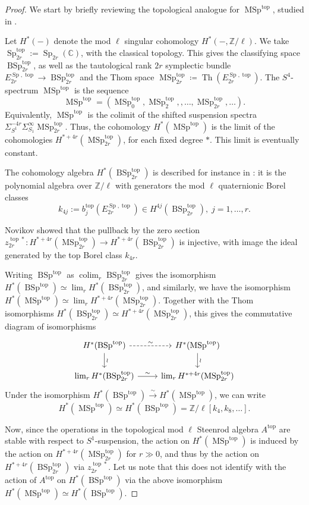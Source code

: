\documentclass[10pt]{amsart}
\theoremstyle{definition}
\theoremstyle{plain}
\numberwithin{equation}{section}
\newcommand{\0}{\emptyset}
\newcommand{\C}{{\mathbb C}}
\newcommand{\Z}{{\mathbb Z}}
\newcommand{\MSp}{{\operatorname{MSp}}}
\newcommand{\BSp}{{\operatorname{BSp}}}
\newcommand{\Sp}{{\operatorname{Sp}}}
\newcommand{\Th}{{\operatorname{Th}}}
\renewcommand{\top}{{\operatorname{top}}}
\newcommand{\colim}{{\operatorname*{colim}}}
\begin{document}
\begin{proof}
    We start by briefly reviewing the topological analogue for $\MSp^{\top}$, studied in \cite[Chapter 1]{Thomcompl}.

    Let $H^*(-)$ denote the mod $\ell$ singular cohomology $H^*(-,\mathbb{Z}/\ell)$. We take $\Sp_{2r}^\top:=\Sp_{2r}(\C)$, with the classical topology. This gives the classifying space $\BSp_{2r}^\top$, as well as the tautological rank $2r$ symplectic bundle $E^{\Sp,\top}_{2r}\to \BSp_{2r}^\top$ and the Thom space $\MSp_{2r}^\top \coloneqq \Th(E^{\Sp,\top}_{2r})$. The $S^4$-spectrum $\MSp^{\top}$ is the sequence 
    $$\MSp^\top=(\MSp_0^\top, \MSp_2^\top, ,\ldots,\MSp_{2r}^\top,\ldots).$$ Equivalently, $\MSp^{\top}$ is the colimit of the shifted suspension spectra $\Sigma^{-4r}_{S^1}\Sigma^\infty_{S_1}\MSp_{2r}^\top$. Thus, the cohomology $H^*(\MSp^\top)$ is the limit of the cohomologies $H^{*+4r}(\MSp_{2r}^\top)$, for each fixed degree $*$. This limit is eventually constant. 
 
 The cohomology algebra $H^{*}(\BSp_{2r}^\top)$ is described for instance in \cite{BorelSerre:Steenrod}: it is the polynomial algebra over $\Z/\ell$ with generators the mod $\ell$ quaternionic Borel classes $$k_{4j}:=b_j^\top(E^{\Sp,\top}_{2r})\in H^{4j}(\BSp_{2r}^\top), \; j=1,\ldots, r.$$
 
 Novikov \cite[Lemma 3]{Thomcompl} showed that the pullback by the zero section $z_{2r}^{\top*}:H^{*+4r}(\MSp_{2r}^\top)\to
 H^{*+4r}(\BSp_{2r}^\top)$ is injective, with image the ideal generated by the top Borel class $k_{4r}$. 
 
Writing $\BSp^\top$ as $\colim_r\BSp_{2r}^\top$ gives the isomorphism $H^*(\BSp^\top)\simeq \lim_rH^*(\BSp_{2r}^\top)$, and similarly, we have the isomorphism 
 $H^*(\MSp^\top)\simeq \lim_rH^{*+4r}(\MSp_{2r}^\top)$. Together with the Thom isomorphisms $H^*(\BSp_{2r}^\top)\simeq H^{*+4r}(\MSp_{2r}^\top)$, this  gives the commutative diagram of isomorphisms
 $$
 \begin{tikzcd}
     H^*(\BSp^\top) \arrow[d, "\wr"] \arrow[r, dashed, "\sim"] & H^*(\MSp^\top) \arrow[d, "\wr"] \\
     \lim_rH^*(\BSp_{2r}^\top) \arrow[r, "\sim"] & \lim_r H^{*+4r}(\MSp_{2r}^\top)
 \end{tikzcd}
 $$
 Under the isomorphism $H^*(\BSp^\top)\xrightarrow{\sim}H^*(\MSp^\top)$, we can write
 $$H^*(\MSp^\top)\simeq H^*(\BSp^\top)= \Z/\ell[k_4, k_8,\ldots].$$
 
 Now, since the operations in the topological mod $\ell$ Steenrod algebra $A^\top$ are stable with respect to $S^1$-suspension, the action on $H^*(\MSp^\top)$ is induced by the action on $H^{*+4r}(\MSp_{2r}^\top)$ for $r\gg0$, and thus by the action on $H^{*+4r}(\BSp_{2r}^\top)$ via $z_{2r}^{\top*}$. Let us note that this does not identify with the action of $A^\top$ on $H^*(\BSp^\top)$ via the above isomorphism $H^*(\MSp^\top)\simeq H^*(\BSp^\top)$.
 

\end{proof}
\end{document}
